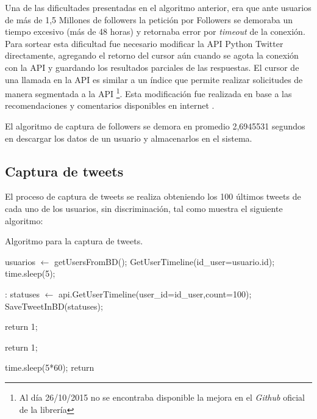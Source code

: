 Una de las dificultades presentadas en el algoritmo anterior, era que ante usuarios de más de 1,5 Millones de followers la petición por Followers se demoraba un tiempo excesivo (más de 48 horas) y retornaba error por \emph{timeout} de la conexión. Para sortear esta dificultad fue necesario modificar la API Python Twitter directamente, agregando el retorno del cursor aún cuando se agota la conexión con la API y guardando los resultados parciales de las respuestas. El cursor de una llamada en la API es similar a un índice que permite realizar solicitudes de manera segmentada a la API \footnote{ Al día 26/10/2015 no se encontraba disponible la mejora en el \emph{Github} oficial de la librería}. Esta modificación fue realizada en base a las recomendaciones y comentarios disponibles en internet \cite{pythonTwitterCode} \cite{pythonTwitterGithub}. 



El algoritmo de captura de followers se demora en promedio 2,6945531 segundos en descargar los datos de un usuario y almacenarlos en el sistema.


\subsection{Captura de tweets}

El proceso de captura de tweets se realiza obteniendo los 100 últimos tweets de cada uno de los usuarios, sin discriminación, tal como muestra el siguiente algoritmo:

\begin{algorithm}[H]
	\caption{Algoritmo para la captura de tweets.}\label{getTweets}
	\begin{algorithmic}[1]
		\State usuarios $\gets$ getUsersFromBD();
		\State GetUserTimeline(id\_user=usuario.id);
		\EndFor
		\State time.sleep(5);
		\EndFunction
		
		:
		\State statuses $\gets$ api.GetUserTimeline(user\_id=id\_user,count=100);
		\State SaveTweetInBD(statuses);
		
		\State return 1;
		\EndIf
		
		\State return 1;
		\EndIf
		
		\State time.sleep(5*60);
		\State return
		\EndIf
		\EndFunction
	\end{algorithmic}
\end{algorithm}


